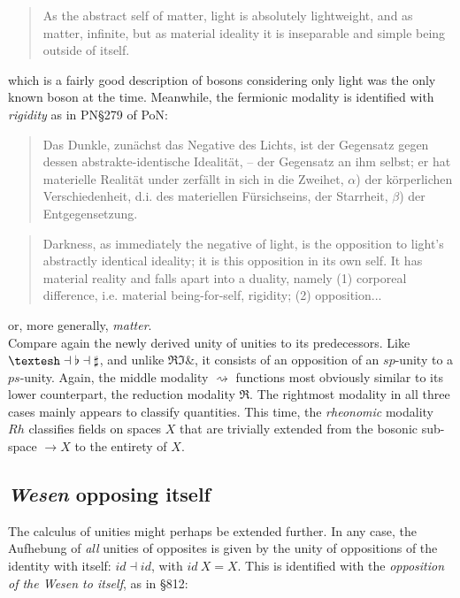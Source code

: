 \documentclass{article}
\begin{document}
\begin{quote}
    As the abstract self of matter, light is absolutely lightweight, and as matter, infinite, but as material ideality it is inseparable and simple being outside of itself. 
\end{quote}

which is a fairly good description of bosons considering only light was the only known boson at the time.
Meanwhile, the fermionic modality is identified with \emph{rigidity} as in PN§279 of PoN:

\begin{quote}
    Das Dunkle, zunächst das Negative des Lichts, ist der Gegensatz gegen dessen abstrakte-identische Idealität, – der Gegensatz an ihm selbst; er hat materielle Realität under zerfällt in sich in die Zweihet, $\alpha$) der körperlichen Verschiedenheit, d.i. des materiellen Fürsichseins, der Starrheit, $\beta$) der Entgegensetzung.
\end{quote}

\begin{quote}
    Darkness, as immediately the negative of light, is the opposition to light’s abstractly identical ideality; it is this opposition in its own self. It has material reality and falls apart into a duality, namely (1) corporeal difference, i.e. material being-for-self, rigidity; (2) opposition...
\end{quote}

or, more generally, \emph{matter}. \\

Compare again the newly derived unity of unities to its predecessors. Like
$\textrm{\textesh}\dashv\flat\dashv\sharp$, and unlike $\Re\Im\&$, it consists of an opposition of an
$sp$-unity to a $ps$-unity. Again, the middle modality $\rightsquigarrow$ functions most obviously similar to
its lower counterpart, the reduction modality $\Re$. The rightmost modality in all three cases mainly appears
to classify quantities. This time, the \emph{rheonomic} modality $Rh$ classifies fields on spaces $X$ that
are trivially extended from the bosonic sub-space $\rightarrow X$ to the entirety of $X$. 


\subsection{\emph{Wesen} opposing itself}\label{Wesen}
The calculus of unities might perhaps be extended further. In any case, the Aufhebung of \emph{all} unities
of opposites is given by the unity of oppositions of the identity with itself: $id\dashv id$, with $id\ X=X$.
This is identified with the \emph{opposition of the \emph{Wesen} to itself}, as in §812:
\end{document}
